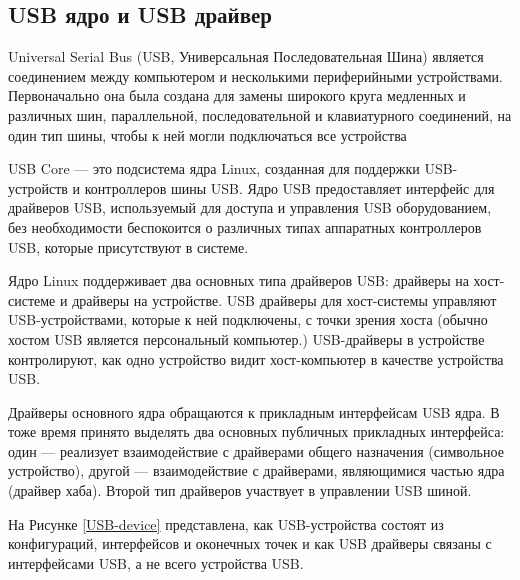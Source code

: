\subsection{USB ядро и USB драйвер}
Universal Serial Bus (USB, Универсальная Последовательная Шина) является соединением
между компьютером и несколькими периферийными устройствами. Первоначально она была
создана для замены широкого круга медленных и различных шин, параллельной,
последовательной и клавиатурного соединений, на один тип шины, чтобы к ней могли
подключаться все устройства\par

USB Core — это подсистема ядра Linux, созданная для поддержки USB-устройств и контроллеров шины USB. Ядро USB предоставляет интерфейс для драйверов USB, используемый для доступа и
управления USB оборудованием, без необходимости беспокоится о различных типах
аппаратных контроллеров USB, которые присутствуют в системе.\par

Ядро Linux поддерживает два основных типа драйверов USB: драйверы на хост-системе и
драйверы на устройстве. USB драйверы для хост-системы управляют USB-устройствами,
которые к ней подключены, с точки зрения хоста (обычно хостом USB является персональный
компьютер.) USB-драйверы в устройстве контролируют, как одно устройство видит хост-компьютер в качестве устройства USB.\par
Драйверы основного ядра обращаются к прикладным
интерфейсам USB ядра. В тоже время принято выделять два основных
публичных прикладных интерфейса: один --- реализует взаимодействие с
драйверами общего назначения (символьное устройство), другой ---
взаимодействие с драйверами, являющимися частью ядра (драйвер хаба).
Второй тип драйверов участвует в управлении USB шиной.\par
На Рисунке \ref{USB-device} 
представлена, как USB-устройства состоят из конфигураций, интерфейсов и оконечных точек и как USB
драйверы связаны с интерфейсами USB, а не всего устройства USB.

